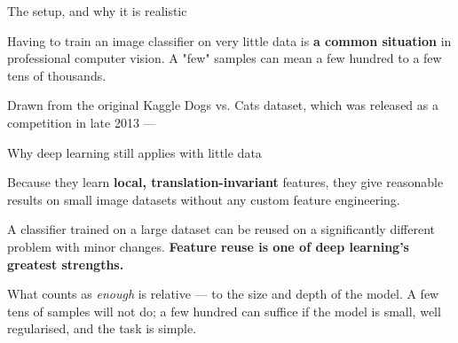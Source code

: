 \documentclass[aspectratio=169,11pt,t]{beamer}
\begin{document}
\begin{frame}{The setup, and why it is realistic}
{\fontsize{9.4}{12.6}\selectfont\color{fg2}Having to train an image classifier on very little data is \textbf{a common situation} in professional computer vision. A "few" samples can mean a few hundred to a few tens of thousands.\par}\vskip 4pt
\begin{minipage}[t]{0.3253\textwidth}
\end{minipage}%
\hfill
\begin{minipage}[t]{0.3253\textwidth}
\end{minipage}%
\hfill
\begin{minipage}[t]{0.3253\textwidth}
\end{minipage}%
{\fontsize{9.4}{12.6}\selectfont\color{fg2}Drawn from the original Kaggle Dogs vs. Cats dataset, which was released as a competition in late 2013 --- \par}\vskip 4pt
\end{frame}

\begin{frame}{Why deep learning still applies with little data}
\begin{minipage}[t]{0.494\textwidth}
\begin{icardgood}
Because they learn \textbf{local, translation-invariant} features, they give reasonable results on small image datasets without any custom feature engineering.
\end{icardgood}
\end{minipage}%
\hfill
\begin{minipage}[t]{0.494\textwidth}
\begin{icardgood}
A classifier trained on a large dataset can be reused on a significantly different problem with minor changes. \textbf{Feature reuse is one of deep learning's greatest strengths.}
\end{icardgood}
\end{minipage}%
{\fontsize{9.4}{12.6}\selectfont\color{fg2}What counts as \textit{enough} is relative --- to the size and depth of the model. A few tens of samples will not do; a few hundred can suffice if the model is small, well regularised, and the task is simple.\par}\vskip 4pt
\end{frame}
\end{document}

